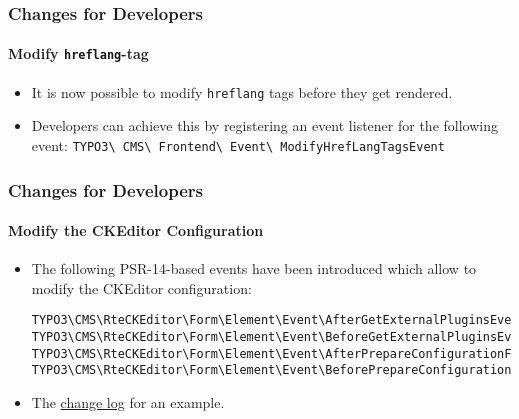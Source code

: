 
\begin{frame}[fragile]
	\frametitle{Changes for Developers}
	\framesubtitle{Modify \texttt{hreflang}-tag}

	\lstset{basicstyle=\smaller\ttfamily}

	\begin{itemize}
		\item It is now possible to modify \texttt{hreflang} tags before they get rendered.
		\item Developers can achieve this by registering an event listener for the following event:\newline
			\smaller
				\texttt{TYPO3\textbackslash
					CMS\textbackslash
					Frontend\textbackslash
					Event\textbackslash
					ModifyHrefLangTagsEvent}
			\normalsize
	\end{itemize}

\end{frame}


\begin{frame}[fragile]
	\frametitle{Changes for Developers}
	\framesubtitle{Modify the CKEditor Configuration}

	\lstset{basicstyle=\tiny\ttfamily}

	\begin{itemize}
		\item The following PSR-14-based events have been introduced which allow to modify the CKEditor configuration:

\vspace{-0.4cm}
\begin{lstlisting}
TYPO3\CMS\RteCKEditor\Form\Element\Event\AfterGetExternalPluginsEvent
TYPO3\CMS\RteCKEditor\Form\Element\Event\BeforeGetExternalPluginsEvent
TYPO3\CMS\RteCKEditor\Form\Element\Event\AfterPrepareConfigurationForEditorEvent
TYPO3\CMS\RteCKEditor\Form\Element\Event\BeforePrepareConfigurationForEditorEvent
\end{lstlisting}

		\item The
			\href{https://docs.typo3.org/c/typo3/cms-core/master/en-us/Changelog/10.3/Feature-88818-IntroduceEventsToModifyCKEditorConfiguration.html}{change log}
			for an example.
	\end{itemize}

\end{frame}

